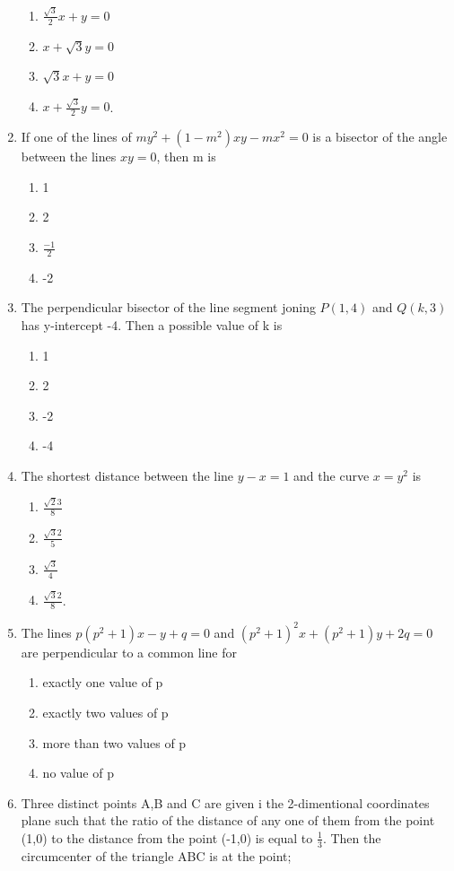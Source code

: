 \documentclass[12pt]{article}
\begin{document}
\begin{enumerate}
\begin{enumerate}
\item $\frac{\sqrt{3}}{2}x+y=0$ 
\item $x+\sqrt{3}y=0$ 
\item $\sqrt{3}x+y=0$ 
\item $x+\frac{\sqrt{3}}{2}y=0$.
\end{enumerate}
\item If one of the lines of $my^2+(1-m^2)xy-mx^2=0$ is a bisector of the angle between the lines $xy=0$, then m is
\begin{enumerate}
\item 1  
\item 2 
\item $\frac{-1}{2}$ 
\item -2
\end{enumerate}
\item The perpendicular bisector of the line segment joning $P(1,4)$ and $Q(k,3)$ has y-intercept -4. Then a possible value of k is
\begin{enumerate}
\item  1 
\item  2 
\item -2 
\item -4
\end{enumerate}
\item The shortest distance between the line $y-x=1$ and the curve $x=y^2$ is 
\begin{enumerate}
\item $\frac{\sqrt{2}{3}}{8}$ 
\item $\frac{\sqrt{3}{2}}{5}$ 
\item $\frac{\sqrt{3}}{4}$ 
\item $\frac{\sqrt{3}{2}}{8}$.
\end{enumerate}
\item The lines $p(p^2+1)x-y+q=0$ and $(p^2+1)^2x+(p^2+1)y+2q=0$ are perpendicular to a common line for 
\begin{enumerate}
\item exactly one value of p
\item exactly two values of p
\item more than two values of p
\item no value of p
\end{enumerate}
\item Three distinct points A,B and C are given i the 2-dimentional coordinates plane such that the ratio of the  distance of any one of them from the point (1,0) to the distance from the point (-1,0) is equal to $\frac{1}{3}$. Then the circumcenter of the triangle ABC is at the point;

\end{enumerate}
\end{document}
